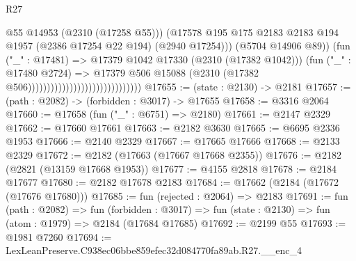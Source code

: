 \begin{lexlean}{R27}
\begin{coremodule}
                                                                @55
                                                                @14953
                                                                (@2310 (@17258 @55)))
                                                              (@17578
                                                                @195
                                                                @175
                                                                @2183
                                                                @2183
                                                                @194
                                                                @1957
                                                                (@2386 @17254 @22 @194)
                                                                (@2940 @17254)))
                                                            (@5704 @14906 @89))
                                                          (fun ("_" : @17481) =>
                                                          @17379
                                                            @1042
                                                            @17330
                                                            (@2310 (@17382 @1042)))
                                                          (fun ("_" : @17480 @2724) =>
                                                          @17379
                                                            @506
                                                            @15088
                                                            (@2310
                                                              (@17382
                                                                @506))))))))))))))))))))))))))))))
@17655 := (state : @2130) -> @2181
@17657 := (path : @2082) -> (forbidden : @3017) -> @17655
@17658 := @3316 @2064
@17660 := @17658 (fun ("_" : @6751) => @2180)
@17661 := @2147 @2329
@17662 := @17660 @17661
@17663 := @2182 @3630
@17665 := @6695 @2336 @1953
@17666 := @2140 @2329
@17667 := @17665 @17666
@17668 := @2133 @2329
@17672 := @2182 (@17663 (@17667 @17668 @2355))
@17676 := @2182 (@2821 (@13159 @17668 @1953))
@17677 := @4155 @2818
@17678 := @2184 @17677
@17680 := @2182 @17678 @2183
@17684 := @17662 (@2184 (@17672 (@17676 @17680)))
@17685 := fun (rejected : @2064) => @2183
@17691 := fun (path : @2082) =>
  fun (forbidden : @3017) => fun (state : @2130) => fun (atom : @1979) => @2184 (@17684 @17685)
@17692 := @2199 @55
@17693 := @1981 @7260
@17694 := LexLeanPreserve.C938ec06bbe859efec32d084770fa89ab.R27.__enc_4

\end{coremodule}
\end{lexlean}

